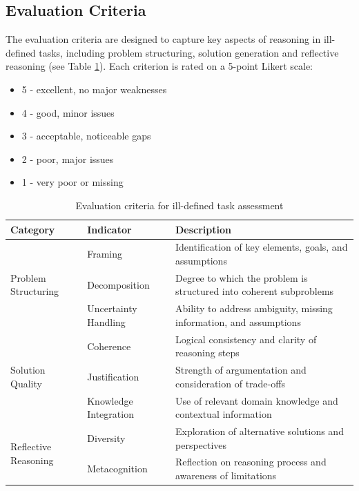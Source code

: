 \subsection{Evaluation Criteria}

The evaluation criteria are designed to capture key aspects of reasoning in ill-defined tasks, including problem structuring, solution generation and reflective reasoning (see Table \ref{table:evaluation_criteria}). Each criterion is rated on a 5-point Likert scale:

\begin{itemize}
    \item 5 - excellent, no major weaknesses
    \item 4 - good, minor issues
    \item 3 - acceptable, noticeable gaps
    \item 2 - poor, major issues
    \item 1 - very poor or missing
\end{itemize}

\begin{table}[h]
\centering
\caption{Evaluation criteria for ill-defined task assessment}
\begin{tabularx}{\textwidth}{l | l X}
\midrule
\textbf{Category} & \textbf{Indicator} & \textbf{Description} \\
\midrule

\multirow{3}{*}{Problem Structuring} 
& Framing 
& Identification of key elements, goals, and assumptions \\

\cmidrule{2-3}

& Decomposition 
& Degree to which the problem is structured into coherent subproblems \\

\cmidrule{2-3}

& Uncertainty Handling 
& Ability to address ambiguity, missing information, and assumptions \\

\midrule

\multirow{3}{*}{Solution Quality} 
& Coherence 
& Logical consistency and clarity of reasoning steps \\

\cmidrule{2-3}

& Justification 
& Strength of argumentation and consideration of trade-offs \\

\cmidrule{2-3}

& Knowledge Integration 
& Use of relevant domain knowledge and contextual information \\

\midrule

\multirow{2}{*}{Reflective Reasoning} 
& Diversity 
& Exploration of alternative solutions and perspectives \\

\cmidrule{2-3}

& Metacognition 
& Reflection on reasoning process and awareness of limitations \\

\midrule
\end{tabularx}
\label{table:evaluation_criteria}
\end{table}